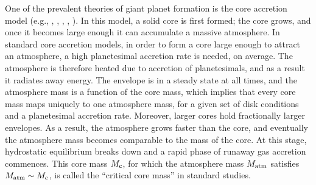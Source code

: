 \documentclass[apj]{emulateapj}
\newcommand{\co}{_{\rm c}}
\begin{document}
%
%

One of the prevalent theories of giant planet formation is the core accretion model  (e.g., \citealt{mizuno78}, \citealt{stevenson82}, \citealt{boden86}, \citealt{wuchterl93}, \citealt{dangelo11}). In this model, a solid core is first formed; the core grows, and once it becomes large enough it can accumulate a massive atmosphere. In standard core accretion models, in order to form a core large enough to attract an atmosphere, a high planetesimal accretion rate is needed, on average. The atmosphere is therefore heated due to accretion of planetesimals, and as a result it radiates away energy. The envelope is in a steady state at all times, and the atmosphere mass is a function of the core mass, which implies that every core mass maps uniquely to one atmosphere mass, for a given set of disk conditions and a planetesimal accretion rate. Moreover, larger cores hold fractionally larger envelopes. As a result, the atmosphere grows faster than the core, and eventually the atmosphere mass becomes comparable to the mass of the core. At this stage, hydrostatic equilibrium breaks down and a rapid phase of runaway gas accretion commences. This core mass $M\co$, for which the atmosphere mass $M_{\rm{atm}}$ satisfies $M_{\rm{atm}}\sim M\co$, is called the ``critical core mass'' in standard studies.
\end{document}
